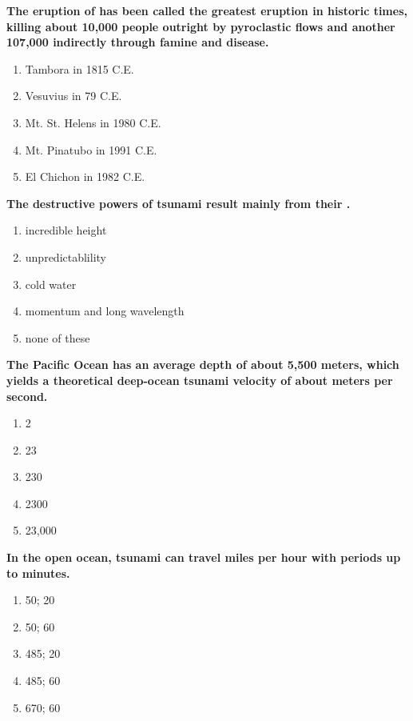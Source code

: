 \item {
\setlength{\itemsep}{0cm}
\setlength{\parskip}{.2cm}
\begin{samepage}
\textbf{
The eruption of \makebox[1cm]{\Rivpt\hrulefill\Rivpt} has been called the greatest eruption in historic times, killing about 10,000 people outright by pyroclastic flows and another 107,000 indirectly through famine and disease. 
}
\begin{enumerate}
\item {  Tambora in 1815 C.E. }
\item {  Vesuvius in 79 C.E. }
\item {  Mt. St. Helens in 1980 C.E. }
\item {  Mt. Pinatubo in 1991 C.E. }
\item {  El Chichon in 1982 C.E. }
\end{enumerate}
\end{samepage}
}
\item {
\setlength{\itemsep}{0cm}
\setlength{\parskip}{.2cm}
\begin{samepage}
\textbf{
The destructive powers of tsunami result mainly from their \makebox[1cm]{\Rivpt\hrulefill\Rivpt}.
}
\begin{enumerate}
\item { 	incredible height }
\item { 	unpredictablility }
\item { 	cold water }
\item { 	momentum and long wavelength }
\item { 	none of these 		 }
\end{enumerate}
\end{samepage}
}
\item {
\setlength{\itemsep}{0cm}
\setlength{\parskip}{.2cm}
\begin{samepage}
\textbf{
The Pacific Ocean has an average depth of about 5,500 meters, which yields a theoretical deep-ocean tsunami velocity of about \makebox[1cm]{\Rivpt\hrulefill\Rivpt} meters per second.
}
\begin{enumerate}
\item { 	2 }
\item { 	23 }
\item { 	230 }
\item { 	2300 }
\item { 	23,000 		 }
\end{enumerate}
\end{samepage}
}
\item {
\setlength{\itemsep}{0cm}
\setlength{\parskip}{.2cm}
\begin{samepage}
\textbf{
In the open ocean, tsunami can travel \makebox[1cm]{\Rivpt\hrulefill\Rivpt} miles per hour with periods up to \makebox[1cm]{\Rivpt\hrulefill\Rivpt} minutes.
}
\begin{enumerate}
\item { 	50; 20 }
\item { 	50; 60 }
\item { 	485; 20 }
\item { 	485; 60 }
\item { 	670; 60 		 }
\end{enumerate}
\end{samepage}
}

